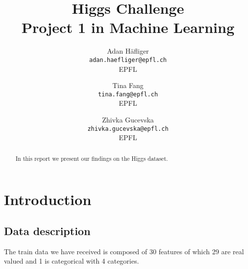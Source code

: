 \documentclass[10pt,conference,compsocconf]{IEEEtran}
\begin{document}
\title{Higgs Challenge \\ \large Project 1 in Machine Learning}

\author{
  Adan Häfliger\\
  \texttt{adan.haefliger@epfl.ch} \\ EPFL
  \and
  Tina Fang\\
  \texttt{tina.fang@epfl.ch}\\ EPFL
  \and
  Zhivka Gucevska\\
  \texttt{zhivka.gucevska@epfl.ch}\\ EPFL
}

\maketitle

\begin{abstract}
In this report we present our findings on the Higgs dataset.
\end{abstract}

\section{Introduction}
\subsection{Data description}
The train data we have received is composed of 30 features of which 29 are real valued and 1 is categorical with 4 categories.




\end{document}
